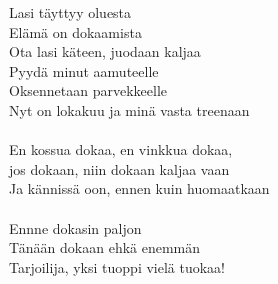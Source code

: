 
Lasi täyttyy oluesta \\
Elämä on dokaamista \\
Ota lasi käteen, juodaan kaljaa \\
Pyydä minut aamuteelle \\
Oksennetaan parvekkeelle \\
Nyt on lokakuu ja minä vasta treenaan \\
\hspace{10mm} \\
En kossua dokaa, en vinkkua dokaa, \\
jos dokaan, niin dokaan kaljaa vaan \\
Ja kännissä oon, ennen kuin huomaatkaan \\
\hspace{10mm} \\
Ennne dokasin paljon \\
Tänään dokaan ehkä enemmän \\
Tarjoilija, yksi tuoppi vielä tuokaa! \\